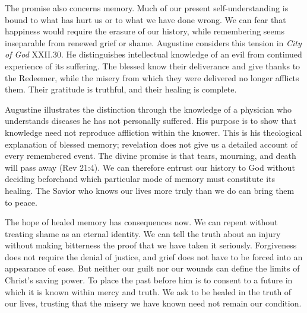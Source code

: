 The promise also concerns memory. Much of our present self-understanding is bound to what has hurt us or to what we have done wrong. We can fear that happiness would require the erasure of our history, while remembering seems inseparable from renewed grief or shame. Augustine considers this tension in \emph{City of God} XXII.30. He distinguishes intellectual knowledge of an evil from continued experience of its suffering. The blessed know their deliverance and give thanks to the Redeemer, while the misery from which they were delivered no longer afflicts them. Their gratitude is truthful, and their healing is complete.

Augustine illustrates the distinction through the knowledge of a physician who understands diseases he has not personally suffered. His purpose is to show that knowledge need not reproduce affliction within the knower. This is his theological explanation of blessed memory; revelation does not give us a detailed account of every remembered event. The divine promise is that tears, mourning, and death will pass away (Rev 21:4). We can therefore entrust our history to God without deciding beforehand which particular mode of memory must constitute its healing. The Savior who knows our lives more truly than we do can bring them to peace.

The hope of healed memory has consequences now. We can repent without treating shame as an eternal identity. We can tell the truth about an injury without making bitterness the proof that we have taken it seriously. Forgiveness does not require the denial of justice, and grief does not have to be forced into an appearance of ease. But neither our guilt nor our wounds can define the limits of Christ's saving power. To place the past before him is to consent to a future in which it is known within mercy and truth. We ask to be healed in the truth of our lives, trusting that the misery we have known need not remain our condition.

